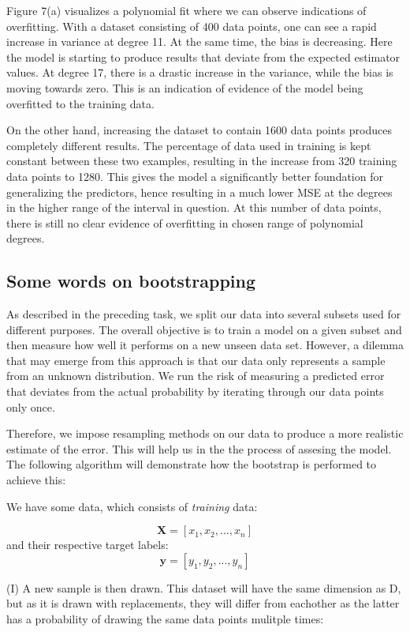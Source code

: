 \documentclass[11pt, a4paper]{article}
\begin{document}
Figure 7(a) visualizes a polynomial fit where we can observe indications of overfitting.  With a dataset consisting of 400 data points, one can see a rapid increase in variance at degree 11. At the same time, the bias is decreasing.  Here the model is starting to produce results that deviate from the expected estimator values. At degree 17, there is a drastic increase in the variance, while the bias is moving towards zero. This is an indication of evidence of the model being overfitted to the training data. 

On the other hand, increasing the dataset to contain 1600 data points produces completely different results. The percentage of data used in training is kept constant between these two examples, resulting in the increase from 320 training data points to 1280. This gives the model a significantly better foundation for generalizing the predictors, hence resulting in a much lower MSE at the degrees in the higher range of the interval in question. At this number of data points, there is still no clear evidence of overfitting in chosen range of polynomial degrees. 

\subsection*{Some words on bootstrapping}
As described in the preceding task, we split our data into several subsets used for different purposes. The overall objective is to train a model on a given subset and then measure how well it performs on a new unseen data set. However, a dilemma that may emerge from this approach is that our data only represents a sample from an unknown distribution. We run the risk of measuring a predicted error that deviates from the actual probability by iterating through our data points only once.

Therefore, we impose resampling methods on our data to produce a more realistic estimate of the error. This will help us in the the process of assesing the model. The following algorithm will demonstrate how the bootstrap is performed to achieve this:

We have some data, which consists of \emph{training} data:

$$\bm{X} = [x_1,x_2,...,x_n]$$
and their respective target labels:
$$\bm{y} = [y_1,y_2,...,y_n]$$


(I) A new sample is then drawn. This dataset will have the same dimension as D, but as it is drawn with replacements, they will differ from eachother as the latter has a probability of drawing the same data points mulitple times:
\end{document}
